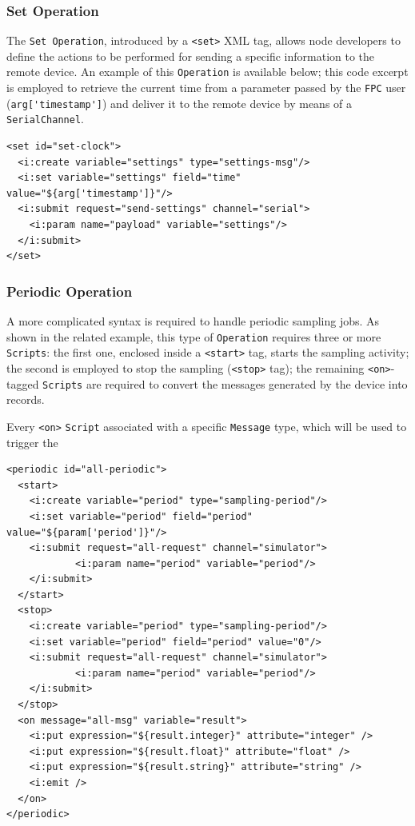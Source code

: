 \subsubsection{Set Operation}

The \texttt{Set Operation}, introduced by a \lstinline!<set>! XML tag, allows
node developers to define the actions to be performed for sending a specific
information to the remote device. An example of this \texttt{Operation} is
available below; this code excerpt is employed to retrieve the current time
from a parameter passed by the \texttt{FPC} user (\lstinline!arg['timestamp']!)
and deliver it to the remote device by means of a \texttt{SerialChannel}.

\lstset{language=XML}
\begin{lstlisting}
<set id="set-clock">
  <i:create variable="settings" type="settings-msg"/>
  <i:set variable="settings" field="time" value="${arg['timestamp']}"/>
  <i:submit request="send-settings" channel="serial">
    <i:param name="payload" variable="settings"/>
  </i:submit>
</set>
\end{lstlisting}

\subsubsection{Periodic Operation}

A more complicated syntax is required to handle periodic sampling jobs. As
shown in the related example, this type of \texttt{Operation} requires three or
more \texttt{Scripts}: the first one, enclosed inside a \lstinline!<start>!
tag, starts the sampling activity; the second is employed to stop the sampling
(\lstinline!<stop>! tag); the remaining \lstinline!<on>!-tagged
\texttt{Scripts} are required to convert the messages generated by the device
into records. 

Every \lstinline!<on>! \texttt{Script} associated with a specific
\texttt{Message} type, which will be used to trigger the 

\lstset{language=XML}
\begin{lstlisting}
<periodic id="all-periodic">
  <start>
    <i:create variable="period" type="sampling-period"/>
    <i:set variable="period" field="period" value="${param['period']}"/>
    <i:submit request="all-request" channel="simulator">
            <i:param name="period" variable="period"/>
    </i:submit>
  </start>
  <stop>
    <i:create variable="period" type="sampling-period"/>
    <i:set variable="period" field="period" value="0"/>
    <i:submit request="all-request" channel="simulator">
            <i:param name="period" variable="period"/>
    </i:submit>
  </stop>
  <on message="all-msg" variable="result">
    <i:put expression="${result.integer}" attribute="integer" />
    <i:put expression="${result.float}" attribute="float" />
    <i:put expression="${result.string}" attribute="string" />
    <i:emit />
  </on>
</periodic>
\end{lstlisting}


